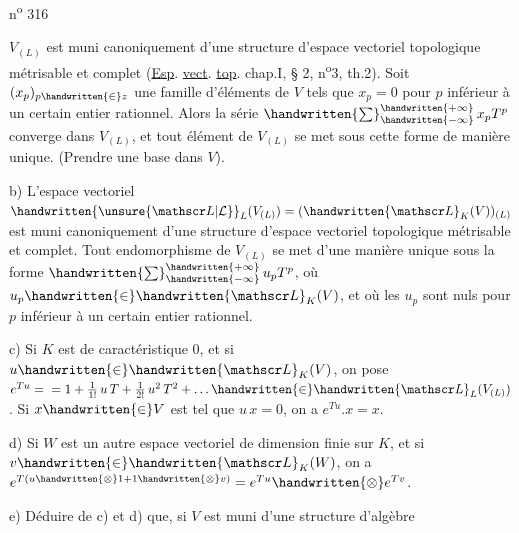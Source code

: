 n\textsuperscript{o} 316

$V_{(L)}$ est muni canoniquement d'une structure d'espace vectoriel topologique métrisable et complet (\uline{Esp}. \uline{vect}. \uline{top}. chap.I, § 2, n\textsuperscript{o}3, th.2).
Soit $(x_p)_{p\handwritten{\in}z}$ une famille d'éléments de $V$ tels que $x_p=0$ pour $p$ inférieur à un certain entier rationnel. Alors la série $\mathop{\handwritten{\sum}}\nolimits_{\handwritten{-\infty}}^{\handwritten{+\infty}}x_p T^p$ converge dans $V_{(L)}$, et tout élément de $V_{(L)}$ se met sous cette forme de manière unique. (Prendre une base dans $V$).

b) L'espace vectoriel $\handwritten{\unsure{\mathscr L|\mathcal L}}_L(V_{(L)})=(\handwritten{\mathscr L}_K(V))_{(L)}$ est muni canoniquement d'une structure d'espace vectoriel topologique métrisable et complet. Tout endomorphisme de $V_{(L)}$ se met d'une manière unique sous la forme $\mathop{\handwritten{\sum}}\nolimits_{\handwritten{-\infty}}^{\handwritten{+\infty}}u_pT^p$, où $u_p\handwritten{\in}\handwritten{\mathscr L}_K(V)$, et où les $u_p$ sont nuls pour $p$ inférieur à un certain entier rationnel.

c) Si $K$ est de caractéristique $0$, et si $u\handwritten{\in}\handwritten{\mathscr L}_K(V)$, on pose $e^{Tu}={}=1+\frac{1}{1!}\,u\,T+\frac{1}{2!}\,u^2\,T^2+\ldots\handwritten{\in}\handwritten{\mathscr L}_L(V_{(L)})$. Si $x\handwritten{\in}V$ est tel que $u\,x=0$, on a $e^{Tu}.x=x$.

d) Si $W$ est un autre espace vectoriel de dimension finie sur $K$, et si $v\handwritten{\in}\handwritten{\mathscr L}_K(W)$, on a $e^{T(u\handwritten{\otimes}1+1\handwritten{\otimes}v)}=e^{Tu}\handwritten{\otimes}e^{Tv}$.

e) Déduire de c) et d) que, si $V$ est muni d'une structure d'algèbre
